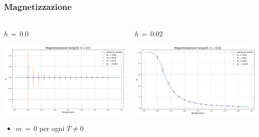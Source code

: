 \begin{frame}
    \frametitle{Magnetizzazione}
    \framesubtitle{}

    \begin{columns}
        \begin{column}{0.5\textwidth}
            \begin{block}{$h\,=\,0.0$}

            \centering
            \includegraphics[width=\textwidth]{Immagini/simIsing1D/magn_h0.0.png}

            \vspace{0.5cm}
            \begin{itemize}[itemsep=0.5em, label=$\diamond$]
                \item $m\,=\,0$ per ogni $T \neq 0$
            \end{itemize}
            
            \end{block}
        \end{column}
    
        \begin{column}{0.5\textwidth}
            \begin{block}{$h\,=\,0.02$}

                \centering
                \includegraphics[width=\textwidth]{Immagini/simIsing1D/magn_h0.02.png}


\end{block}
\end{column}
\end{columns}
\end{frame}
